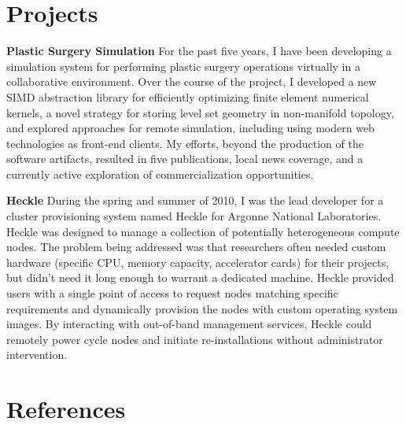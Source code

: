 \documentclass{cv-style}     %
\begin{document}
\section{Projects}
\vspace{-0.2cm}

\textbf{Plastic Surgery Simulation} For the past five years, I have
been developing a simulation system for performing plastic surgery
operations virtually in a collaborative environment. Over the course
of the project, I developed a new SIMD abstraction library for
efficiently optimizing finite element numerical kernels, a novel
strategy for storing level set geometry in non-manifold topology, and
explored approaches for remote simulation, including using modern web
technologies as front-end clients. My efforts, beyond the production
of the software artifacts, resulted in five publications, local news
coverage, and a currently active exploration of commercialization
opportunities.

\textbf{Heckle} During the spring and summer of 2010, I was the lead
developer for a cluster provisioning system named Heckle for Argonne
National Laboratories. Heckle was designed to manage a collection of
potentially heterogeneous compute nodes. The problem being addressed
was that researchers often needed custom hardware (specific CPU,
memory capacity, accelerator cards) for their projects, but didn't
need it long enough to warrant a dedicated machine. Heckle provided users with a single
point of access to request nodes matching specific requirements and
dynamically provision the nodes with custom operating system
images. By interacting with out-of-band management services, Heckle
could remotely power cycle nodes and initiate re-installations without
administrator intervention.



\section{References}
  \vspace{-0.2cm}
\end{document}
